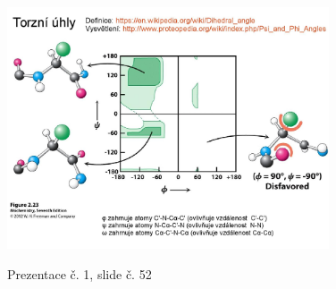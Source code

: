 \documentclass[DIV=8]{scrreprt}
\begin{document}
\begin{figure}
    \caption{Prezentace č. 1, slide č. 52}
    \includegraphics[width=0.85\textwidth]{slides-1/slide-52.jpg}
    \centering
    \label{slides-1-slide-52}
\end{figure}
\end{document}
